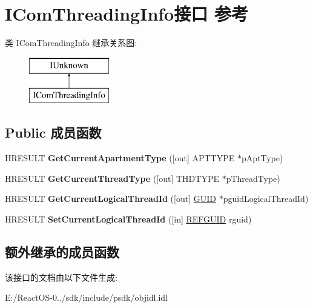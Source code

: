 \hypertarget{interface_i_com_threading_info}{}\section{I\+Com\+Threading\+Info接口 参考}
\label{interface_i_com_threading_info}
类 I\+Com\+Threading\+Info 继承关系图\+:\begin{figure}[H]
\begin{center}
\leavevmode
\includegraphics[height=2.000000cm]{interface_i_com_threading_info}
\end{center}
\end{figure}
\subsection*{Public 成员函数}
\begin{DoxyCompactItemize}
\item 
\mbox{\label{interface_i_com_threading_info_a80edf45cb2e86cfb646f5134bed2a629}} 
H\+R\+E\+S\+U\+LT {\bfseries Get\+Current\+Apartment\+Type} (\mbox{[}out\mbox{]} A\+P\+T\+T\+Y\+PE $\ast$p\+Apt\+Type)
\item 
\mbox{\label{interface_i_com_threading_info_aa214ba6f3dedd825d9ae853c17b17ebe}} 
H\+R\+E\+S\+U\+LT {\bfseries Get\+Current\+Thread\+Type} (\mbox{[}out\mbox{]} T\+H\+D\+T\+Y\+PE $\ast$p\+Thread\+Type)
\item 
\mbox{\label{interface_i_com_threading_info_a80cff5db9050fa3d477e396fb6518d09}} 
H\+R\+E\+S\+U\+LT {\bfseries Get\+Current\+Logical\+Thread\+Id} (\mbox{[}out\mbox{]} \hyperlink{interface_g_u_i_d}{G\+U\+ID} $\ast$pguid\+Logical\+Thread\+Id)
\item 
\mbox{\label{interface_i_com_threading_info_a8c5d5b8ce8a3eb5f05e5a0b5ad948b4e}} 
H\+R\+E\+S\+U\+LT {\bfseries Set\+Current\+Logical\+Thread\+Id} (\mbox{[}in\mbox{]} \hyperlink{struct___g_u_i_d}{R\+E\+F\+G\+U\+ID} rguid)
\end{DoxyCompactItemize}
\subsection*{额外继承的成员函数}


该接口的文档由以下文件生成\+:\begin{DoxyCompactItemize}
\item 
E\+:/\+React\+O\+S-\/0../sdk/include/psdk/objidl.\+idl\end{DoxyCompactItemize}
